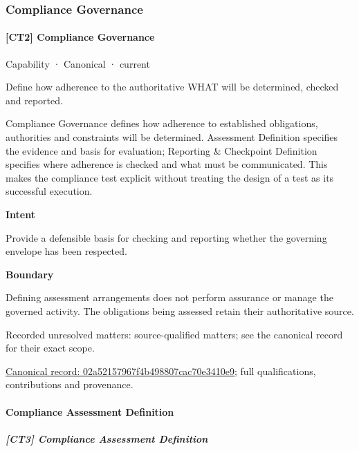 \subsubsection{Compliance Governance}

\paragraph{[CT2] Compliance Governance}

\label{element:02a52157967f4b498807cac70e3410e9}
{\small Capability · Canonical · current}\par

Define how adherence to the authoritative WHAT will be determined, checked and reported.



Compliance Governance defines how adherence to established obligations, authorities and constraints will be determined. Assessment Definition specifies the evidence and basis for evaluation; Reporting \& Checkpoint Definition specifies where adherence is checked and what must be communicated. This makes the compliance test explicit without treating the design of a test as its successful execution.



\textbf{Intent}



Provide a defensible basis for checking and reporting whether the governing envelope has been respected.



\textbf{Boundary}



Defining assessment arrangements does not perform assurance or manage the governed activity. The obligations being assessed retain their authoritative source.


{\small Recorded unresolved matters: source-qualified matters; see the canonical record for their exact scope.}\par
{\footnotesize \href{../../../../continuum/strategy/capability/02a52157967f4b498807cac70e3410e9.md}{Canonical record: 02a52157967f4b498807cac70e3410e9}; full qualifications, contributions and provenance.}\par
\paragraph{Compliance Assessment Definition}

\subparagraph{[CT3] Compliance Assessment Definition}


